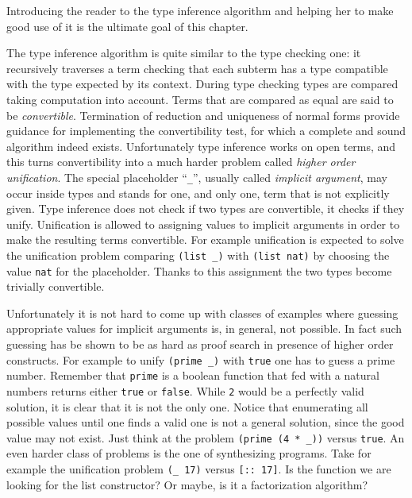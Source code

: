 Introducing the reader to the type inference algorithm and helping her
to make good use of it is the ultimate goal of this chapter.

\mcbREQUIRE{}
\label{sec:hounif}

The type inference algorithm is quite similar to the type checking
one: it recursively traverses a term checking that each subterm has a
type compatible with the type expected by its context.  During type
checking types are compared taking computation into account.  Terms
that are compared as equal are said to be \emph{convertible}.
Termination of reduction and uniqueness of normal forms provide
guidance for implementing the convertibility test, for which a
complete and sound algorithm indeed exists.  Unfortunately type
inference works on open terms, and this turns convertibility into a
much harder problem called \emph{higher order unification}.  The
special placeholder ``\lstinline/_/'', usually called \emph{implicit
argument}, may occur inside types and stands for one, and only one,
term that is not explicitly given.  Type inference does not check if
two types are convertible, it checks if they unify.
Unification is allowed to assigning values to implicit arguments in order
to make the resulting terms convertible.  For example unification is
expected to solve the unification problem comparing \lstinline/(list _)/
with \lstinline/(list nat)/ by choosing the value \lstinline/nat/
for the placeholder.  Thanks to this assignment the two types
become trivially convertible.

Unfortunately it is not hard to come up with classes of examples where
guessing appropriate values for implicit arguments is, in general, not
possible. In fact such guessing has be shown to be as hard as proof
search in presence of higher order constructs.
For example to unify \lstinline/(prime _)/ with
\lstinline/true/ one has to guess a prime number. Remember that
\lstinline/prime/ is a boolean function that fed with a natural
numbers returns either \lstinline/true/ or \lstinline/false/.
While \lstinline/2/ would be a perfectly valid solution, it is clear
that it is not the only one.  Notice that enumerating all possible
values until one finds a valid one is not a general
solution, since the good value may not exist.  Just think at the
problem \lstinline/(prime (4 * _))/ versus \lstinline/true/.  An even
harder class of problems is the one of synthesizing programs.
Take for example the unification problem \lstinline/(_ 17)/ versus
\lstinline/[:: 17]/.  Is the function we are looking for the list
constructor? Or maybe, is it a factorization algorithm?

